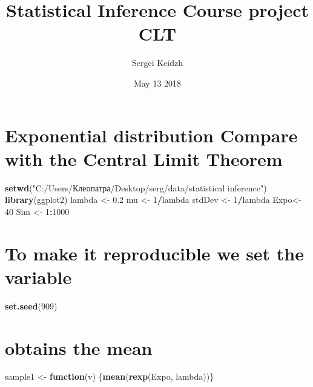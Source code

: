 \documentclass[]{article}
\title{Statistical Inference Course project CLT}
\author{Sergei Keidzh}
\date{May 13 2018}
\newenvironment{Shaded}{\begin{snugshade}}{\end{snugshade}}
\newcommand{\KeywordTok}[1]{\textcolor[rgb]{0.13,0.29,0.53}{\textbf{#1}}}
\newcommand{\DecValTok}[1]{\textcolor[rgb]{0.00,0.00,0.81}{#1}}
\newcommand{\FloatTok}[1]{\textcolor[rgb]{0.00,0.00,0.81}{#1}}
\newcommand{\StringTok}[1]{\textcolor[rgb]{0.31,0.60,0.02}{#1}}
\newcommand{\ControlFlowTok}[1]{\textcolor[rgb]{0.13,0.29,0.53}{\textbf{#1}}}
\newcommand{\OperatorTok}[1]{\textcolor[rgb]{0.81,0.36,0.00}{\textbf{#1}}}
\newcommand{\NormalTok}[1]{#1}
\begin{document}
\maketitle

\section{Exponential distribution Compare with the Central Limit
Theorem}\label{exponential-distribution-compare-with-the-central-limit-theorem}

\begin{Shaded}
\begin{Highlighting}[]
\KeywordTok{setwd}\NormalTok{(}\StringTok{"C:/Users/Клеопатра/Desktop/serg/data/statistical inference"}\NormalTok{)}
\KeywordTok{library}\NormalTok{(ggplot2)}
\NormalTok{lambda <-}\StringTok{ }\FloatTok{0.2}
\NormalTok{mu <-}\StringTok{ }\DecValTok{1}\OperatorTok{/}\NormalTok{lambda}
\NormalTok{stdDev <-}\StringTok{ }\DecValTok{1}\OperatorTok{/}\NormalTok{lambda}
\NormalTok{Expo<-}\StringTok{ }\DecValTok{40}
\NormalTok{Sim <-}\StringTok{ }\DecValTok{1}\OperatorTok{:}\DecValTok{1000}
\end{Highlighting}
\end{Shaded}

\section{To make it reproducible we set the
variable}\label{to-make-it-reproducible-we-set-the-variable}

\begin{Shaded}
\begin{Highlighting}[]
\KeywordTok{set.seed}\NormalTok{(}\DecValTok{909}\NormalTok{)}
\end{Highlighting}
\end{Shaded}

\section{obtains the mean}\label{obtains-the-mean}

\begin{Shaded}
\begin{Highlighting}[]
\NormalTok{sample1 <-}\StringTok{ }\ControlFlowTok{function}\NormalTok{(v) \{}\KeywordTok{mean}\NormalTok{(}\KeywordTok{rexp}\NormalTok{(Expo, lambda))\}}
\end{Highlighting}
\end{Shaded}
\end{document}
